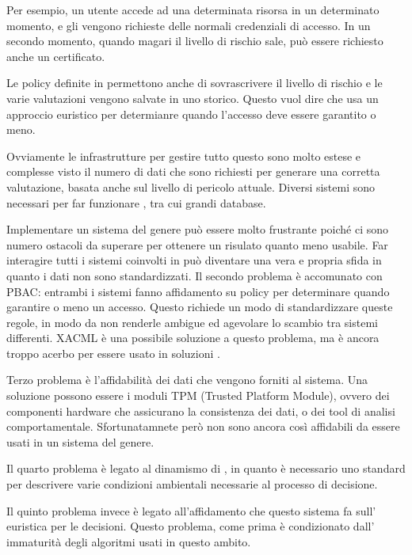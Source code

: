 Per esempio, un utente accede ad una determinata risorsa in un determinato momento, e gli vengono richieste delle normali credenziali di accesso. In un secondo momento, quando magari il livello di rischio sale, può essere richiesto anche un certificato.\\ \par
Le policy definite in \radac permettono anche di sovrascrivere il livello di rischio e le varie valutazioni vengono salvate in uno storico.
Questo vuol dire che \radac usa un approccio euristico per determianre quando l'accesso deve essere garantito o meno.\\ \par
Ovviamente le infrastrutture per gestire tutto questo sono molto estese e complesse visto il numero di dati che sono richiesti per generare una corretta valutazione, basata anche sul livello di pericolo attuale. Diversi sistemi sono necessari per far funzionare \radac, tra cui grandi database.\\ \par
Implementare un sistema del genere può essere molto frustrante poiché ci sono numero ostacoli da 
superare per ottenere un risulato quanto meno usabile.
Far interagire tutti i sistemi coinvolti in \radac può diventare una vera e propria sfida in quanto
i dati non sono standardizzati.
Il secondo problema è accomunato con PBAC: entrambi i sistemi fanno affidamento su policy per determinare quando garantire o meno un accesso. Questo richiede un modo 
di standardizzare queste regole, in modo da non renderle ambigue ed agevolare lo scambio tra sistemi differenti. XACML è una possibile soluzione a questo problema, ma è ancora troppo 
acerbo per essere usato in soluzioni \radac.\\ \par
Terzo problema è l'affidabilità dei dati che vengono forniti al sistema. Una soluzione possono essere i moduli TPM (Trusted Platform Module), ovvero dei componenti hardware che assicurano la consistenza dei dati, o dei tool di analisi comportamentale. Sfortunatamnete però non sono ancora così affidabili da essere usati in un sistema del genere.\\ \par
Il quarto problema è legato al dinamismo di \radac, in quanto è necessario uno 
standard per descrivere varie condizioni ambientali necessarie al processo
di decisione.\\ \par
Il quinto problema invece è legato all'affidamento che questo sistema fa sull'
euristica per le decisioni. Questo problema, come prima è condizionato dall'
immaturità degli algoritmi usati in questo ambito.

